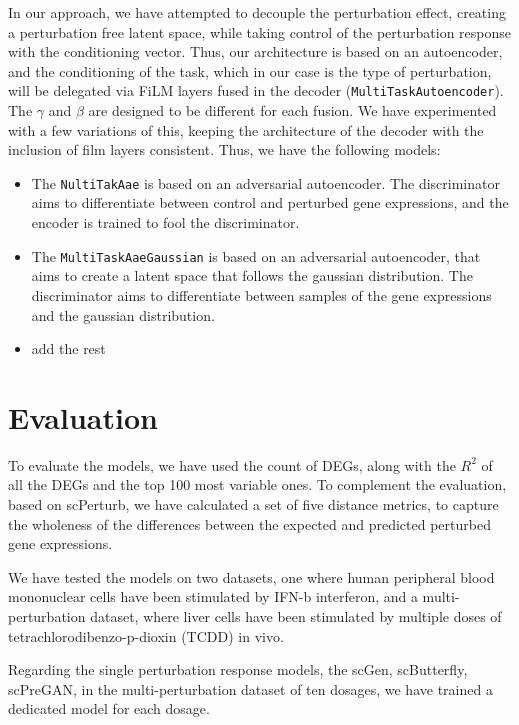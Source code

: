 \documentclass[12pt, a4paper]{article}
\begin{document}
In our approach, we have attempted to decouple the perturbation effect, creating a perturbation free latent space, while taking control of the perturbation response with the conditioning vector. Thus, our architecture is based on an autoencoder, and the conditioning of the task, which in our case is the type of perturbation, will be delegated via FiLM layers fused in the decoder (\verb|MultiTaskAutoencoder|). The $\gamma$ and $\beta$ are designed to be different for each fusion.
We have experimented with a few variations of this, keeping the architecture of the decoder with the inclusion of film layers consistent. Thus, we have the following models:

\begin{itemize}
    \item The \verb|NultiTakAae| is based on an adversarial autoencoder. The discriminator aims to differentiate between control and perturbed gene expressions, and the encoder is trained to fool the discriminator.
    \item The \verb|MultiTaskAaeGaussian| is based on an adversarial autoencoder, that aims to create a latent space that follows the gaussian distribution. The discriminator aims to differentiate between samples of the gene expressions and the gaussian distribution.
    \item add the rest
\end{itemize}


\section{Evaluation}

To evaluate the models, we have used the count of DEGs, along with the $R^2$ of all the DEGs and the top 100 most variable ones. To complement the evaluation, based on scPerturb, we have calculated a set of five distance metrics, to capture the wholeness of the differences between the expected and predicted perturbed gene expressions.

We have tested the models on two datasets, one where human peripheral blood mononuclear cells have been stimulated by IFN-b interferon, and a multi-perturbation dataset, where liver cells have been stimulated by multiple doses of tetrachlorodibenzo-p-dioxin (TCDD) in vivo.

Regarding the single perturbation response models, the scGen, scButterfly, scPreGAN, in the multi-perturbation dataset of ten dosages, we have trained a dedicated model for each dosage.
\end{document}
